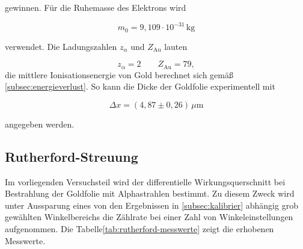 gewinnen.
Für die Ruhemasse des Elektrons \cite{chemiedeElektron} wird 

\[
m_0 = 9{,}109 \cdot 10^{-31}\,\mathrm{kg}
\]

verwendet.
Die Ladungszahlen $z_{\alpha}$ und $Z_{\mathrm{Au}}$ lauten

\[
z_{\alpha} = 2
\qquad
Z_{\mathrm{Au}} = 79,
\]
die mittlere Ionisationsenergie von Gold berechnet sich gemäß \autoref{subsec:energieverlust}.
So kann die Dicke der Goldfolie experimentell mit 

\[
\Delta x = (4{,}87 \pm 0{,}26)\,\mu\mathrm{m}
\]

angegeben werden.




\subsection{Rutherford-Streuung}
\label{subsec:rutherford}

Im vorliegenden Versuchsteil wird der differentielle Wirkungsquerschnitt bei Bestrahlung der Goldfolie mit Alphastrahlen bestimmt.
Zu diesem Zweck wird unter Aussparung eines von den Ergebnissen in \autoref{subsec:kalibrier} abhängig grob gewählten Winkelbereichs die Zählrate bei einer Zahl von Winkeleinstellungen aufgenommen.  Die Tabelle\autoref{tab:rutherford-messwerte} zeigt die erhobenen Messwerte. 

\begin{table}[H]
    \centering
    \caption{Messwerte zur Zählrate R in Abhängigkeit vom Streuwinkel $\theta$.}
    \label{tab:rutherford-messwerte}
\end{table}

